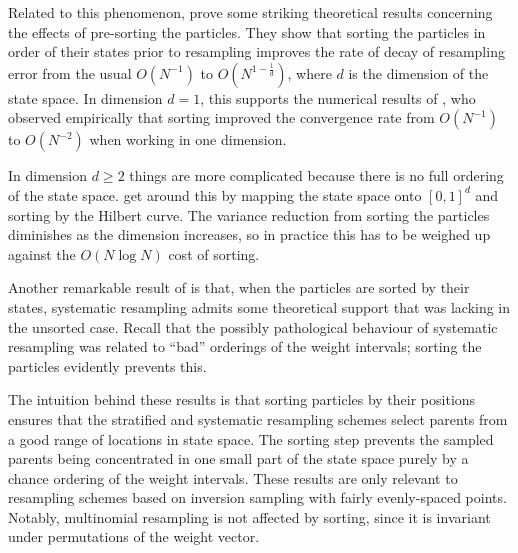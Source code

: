 Related to this phenomenon, \textcite{gerber2017} prove some striking theoretical results concerning the effects of pre-sorting the particles. They show that sorting the particles in order of their states prior to resampling improves the rate of decay of resampling error from the usual $O(N^{-1})$ to $O(N^{1-\frac{1}{d}})$, where $d$ is the dimension of the state space. 
In dimension $d=1$, this supports the numerical results of \textcite{kitagawa1996}, who observed empirically that sorting improved the convergence rate from $O(N^{-1})$ to $O(N^{-2})$ when working in one dimension.

In dimension $d\geq2$ things are more complicated because there is no full ordering of the state space. \textcite{gerber2017} get around this by mapping the state space onto $[0,1]^d$ and sorting by the Hilbert curve. 
The variance reduction from sorting the particles diminishes as the dimension increases, so in practice this has to be weighed up against the $O(N\log N)$ cost of sorting.

Another remarkable result of \textcite{gerber2017} is that, when the particles are sorted by their states, systematic resampling admits some theoretical support that was lacking in the unsorted case.
Recall that the possibly pathological behaviour of systematic resampling was related to ``bad'' orderings of the weight intervals; sorting the particles evidently prevents this.

The intuition behind these results is that sorting particles by their positions ensures that the stratified and systematic resampling schemes select parents from a good range of locations in state space. The sorting step prevents the sampled parents being concentrated in one small part of the state space purely by a chance ordering of the weight intervals.
These results are only relevant to resampling schemes based on inversion sampling with fairly evenly-spaced points. Notably, multinomial resampling is not affected by sorting, since it is invariant under permutations of the weight vector.





